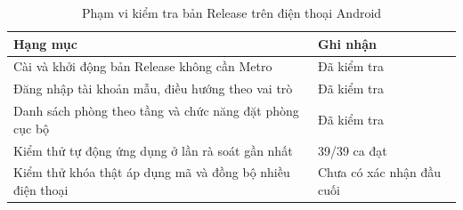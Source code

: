 \documentclass[../DoAn.tex]{subfiles}
\begin{document}
\begin{table}[H]\centering\small\renewcommand{\arraystretch}{1.15}
\caption{Phạm vi kiểm tra bản Release trên điện thoại Android}\label{tab:bienban}
\begin{tabularx}{\textwidth}{|X|p{3.0cm}|}\hline
\textbf{Hạng mục} & \textbf{Ghi nhận} \\ \hline
Cài và khởi động bản Release không cần Metro & Đã kiểm tra \\ \hline
Đăng nhập tài khoản mẫu, điều hướng theo vai trò & Đã kiểm tra \\ \hline
Danh sách phòng theo tầng và chức năng đặt phòng cục bộ & Đã kiểm tra \\ \hline
Kiểm thử tự động ứng dụng ở lần rà soát gần nhất & 39/39 ca đạt \\ \hline
Kiểm thử khóa thật áp dụng mã và đồng bộ nhiều điện thoại & Chưa có xác nhận đầu cuối \\ \hline
\end{tabularx}\end{table}
\end{document}
